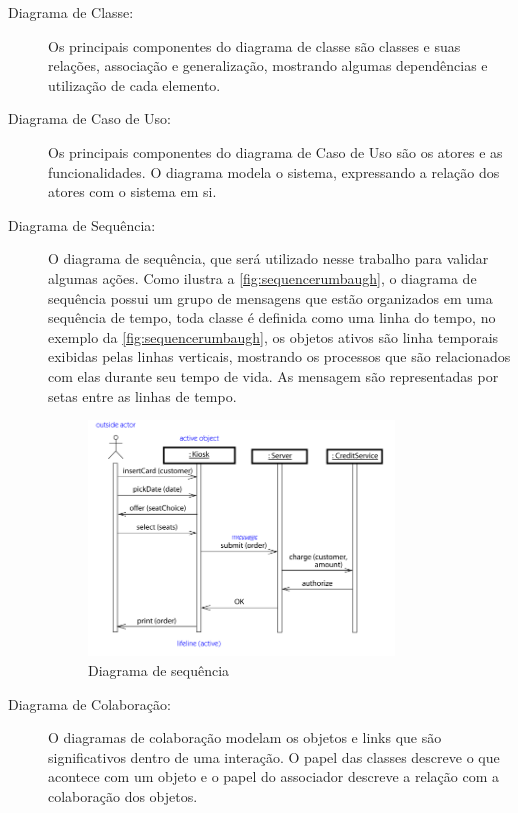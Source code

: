 \begin{description}
    \item[Diagrama de Classe:]Os principais componentes do diagrama de classe são classes e suas relações, associação e generalização, mostrando algumas dependências e utilização de cada elemento.
        
    \item[Diagrama de Caso de Uso:]Os principais componentes do diagrama de Caso de Uso são os atores e as funcionalidades. O diagrama modela o sistema, expressando a relação dos atores com o sistema em si.
 
    
    \item[Diagrama de Sequência:]O diagrama de sequência, que será utilizado nesse trabalho para validar algumas ações. Como ilustra a \autoref{fig:sequencerumbaugh}, o diagrama de sequência possui um grupo de mensagens que estão organizados em uma sequência de tempo, toda classe é definida como uma linha do tempo, no exemplo da \autoref{fig:sequencerumbaugh}, os objetos ativos são linha temporais exibidas pelas linhas verticais, mostrando os processos que são relacionados com elas durante seu tempo de vida. As mensagem são representadas por setas entre as linhas de tempo.
    
        \begin{figure}[H]
    	    \centering
        	\caption{\label{fig:sequencerumbaugh} Diagrama de sequência }
    		\includegraphics[width = 0.8\textwidth]	{diagramas/sequencediagramrumbaugh}
        \end{figure}


    
    \item[Diagrama de Colaboração:]O diagramas de colaboração modelam os objetos e links que são significativos dentro de uma interação. O papel das classes descreve o que acontece com um objeto e o papel do associador descreve a relação com a colaboração dos objetos.


\end{description}
